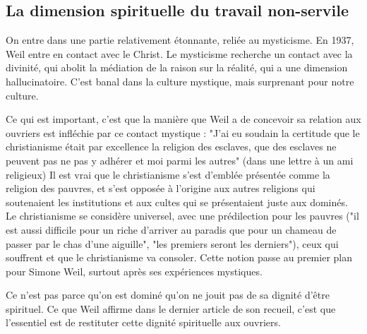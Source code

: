 \documentclass[a4paper,12pt]{book}
\begin{document}
\subsection{La dimension spirituelle du travail non-servile}
On entre dans une partie relativement étonnante, reliée au mysticisme. En 1937, Weil entre en contact avec le Christ. Le mysticisme recherche un contact avec la divinité, qui abolit la médiation de la raison sur la réalité, qui a une dimension hallucinatoire. C'est banal dans la culture mystique, mais surprenant pour notre culture.
\par Ce qui est important, c'est que la manière que Weil a de concevoir sa relation aux ouvriers est infléchie par ce contact mystique : "J'ai eu soudain la certitude que le christianisme était par excellence la religion des esclaves, que des esclaves ne peuvent pas ne pas y adhérer et moi parmi les autres" (dans une lettre à un ami religieux) Il est vrai que le christianisme s'est d'emblée présentée comme la religion des pauvres, et s'est opposée à l'origine aux autres religions qui soutenaient les institutions et aux cultes qui se présentaient juste aux dominés. Le christianisme se considère universel, avec une prédilection pour les pauvres ("il est aussi difficile pour un riche d'arriver au paradis que pour un chameau de passer par le chas d'une aiguille", "les premiers seront les derniers"), ceux qui souffrent et que le christianisme va consoler. Cette notion passe au premier plan pour Simone Weil, surtout après ses expériences mystiques.
\par Ce n'est pas parce qu'on est dominé qu'on ne jouit pas de sa dignité d'être spirituel. Ce que Weil affirme dans le dernier article de son recueil, c'est que l'essentiel est de restituter cette dignité spirituelle aux ouvriers.
\end{document}
